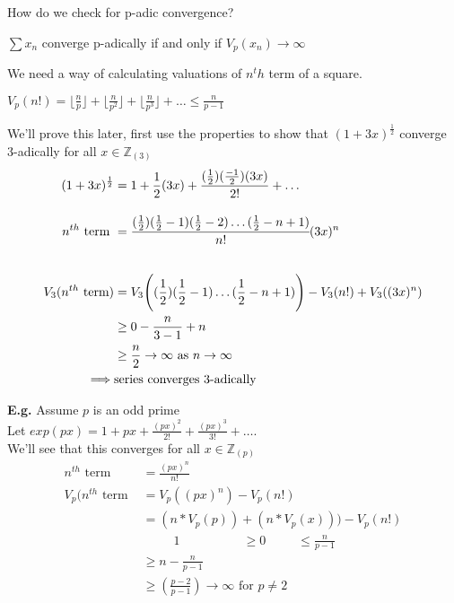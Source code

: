 \documentclass[11pt]{article}
\begin{document}
How do we check for p-adic convergence?

\begin{lemma}
	$\sum x_n$ converge p-adically if and only if $V_p(x_n) \rightarrow \infty$
\end{lemma}
We need a way of calculating valuations of $n^th$ term of a square.

\begin{proposition}
	$V_p(n!) = \lfloor{\frac{n}{p}} \rfloor +   \lfloor{\frac{n}{p^2}} \rfloor +  \lfloor{\frac{n}{p^3}} \rfloor + \dots \leq \frac{n}{p-1} $
\end{proposition}
We'll prove this later, first use the properties to show that $(1+3x)^\frac{1}{2}$ converge 3-adically for all $x \in \mathbb{Z}_{(3)}$
\begin{align*}
	(1+3x)^\frac{1}{2} &= 1+ \frac{1}{2} (3x) + \frac{(\frac{1}{2}) (\frac{-1}{2}) (3x)}{2!} +\dots \\[1em]
	n^{th} \text{ term } &= \cfrac{(\frac{1}{2}) (\frac{1}{2}-1) (\frac{1}{2}-2)\dots (\frac{1}{2} - n+1) }{n!}(3x)^n\\[2em]
	V_3(n^{th} \text{ term}) &= V_3\Bigg((\frac{1}{2})(\frac{1}{2}-1) \dots (\frac{1}{2}-n+1)\Bigg) - V_3(n!) + V_3((3x)^n) \\
	&\geq 0 - \frac{n}{3-1} + n\\
	&\geq \frac{n}{2} \rightarrow \infty \text{ as } n \rightarrow \infty\\
	\implies & \text{series converges 3-adically}
\end{align*}

\textbf{E.g.} Assume $p$ is an odd prime\\[1em]

Let $exp(px) = 1+px+\frac{(px)^2}{2!} + \frac{(px)^3}{3!} + \dots$.\\
We'll see that this converges for all $x\in \mathbb{Z}_{(p)}$
\begin{align*}
	n^{th} \text{ term }&= \frac{(px)^n}{n!}\\[2em]
	V_p(n^{th} \text{ term } &= V_p((px)^n) - V_p(n!)\\
	&= (n*V_p(p)) + (n*V_p(x))) - V_p(n!)\\
	   &\hspace{30pt} 1 \hspace{60pt} \geq 0 \hspace{30pt}\leq \frac{n}{p-1}\\
	   & \geq n - \frac{n}{p-1}\\[0.5em]
	   &\geq (\frac{p-2}{p-1}) \rightarrow \infty \text{ for } p \neq 2
\end{align*}
\end{document}

